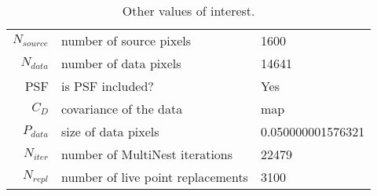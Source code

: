 \begin{table*}[!htb]\caption{Other values of interest.}\begin{center}\begin{tabular}{ r l l }\hline $N_{source}$ & number of source pixels           & 1600 \\ 
 $N_{data}$   & number of data pixels             & 14641 \\ 
 PSF & is PSF included?                          & Yes \\
 $C_D$        & covariance of the data            & map \\ 
 $P_{data}$   & size of data pixels               & 0.050000001576321 \\ 
 $N_{iter}$   & number of MultiNest iterations    & 22479 \\ 
 $N_{repl}$   & number of live point replacements & 3100 \\ 
\hline\end{tabular}\end{center}\label{tab:3}\end{table*}